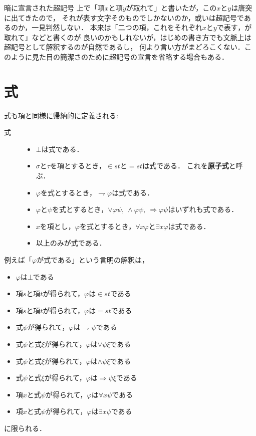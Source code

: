 	\begin{itembox}[l]{暗に宣言された超記号}
		上で「項$x$と項$y$が取れて」と書いたが，この$x$と$y$は唐突に出てきたので，
		それが表す文字そのものでしかないのか，或いは超記号であるのか，一見判然しない．
		本来は「二つの項，これをそれぞれ$x$と$y$で表す，が取れて」などと書くのが
		良いのかもしれないが，はじめの書き方でも文脈上は超記号として解釈するのが自然であるし，
		何より言い方がまどろこくない．このように見た目の簡潔さのために超記号の宣言を省略する場合もある．
	\end{itembox}
	
\section{式}
	式も項と同様に帰納的に定義される:
	
	\begin{description}
		\item[式]
			\begin{itemize}
				\item $\bot$は式である．
				\item $\sigma$と$\tau$を項とするとき，$\in st$と$=st$は式である．
					これを{\bf 原子式}と呼ぶ．
				\item $\varphi$を式とするとき，$\rightharpoondown \varphi$は式である．
				\item $\varphi$と$\psi$を式とするとき，$\vee \varphi \psi,\ 
					\wedge \varphi \psi,\ \Longrightarrow \varphi \psi$はいずれも式である．
			
				\item $x$を項とし，$\varphi$を式とするとき，$\forall x \varphi$と$\exists x \varphi$は式である．
				
				\item 以上のみが式である．
			\end{itemize}
	\end{description}
	
	例えば「$\varphi$が式である」という言明の解釈は，
	\begin{itemize}
		\item $\varphi$は$\bot$である
		\item 項$s$と項$t$が得られて，$\varphi$は$\in s t$である
		\item 項$s$と項$t$が得られて，$\varphi$は$= s t$である
		\item 式$\psi$が得られて，$\varphi$は$\rightharpoondown \psi$である
		\item 式$\psi$と式$\xi$が得られて，$\varphi$は$\vee \psi \xi$である
		\item 式$\psi$と式$\xi$が得られて，$\varphi$は$\wedge \psi \xi$である
		\item 式$\psi$と式$\xi$が得られて，$\varphi$は$\Longrightarrow \psi \xi$である
		\item 項$x$と式$\psi$が得られて，$\varphi$は$\forall x \psi$である
		\item 項$x$と式$\psi$が得られて，$\varphi$は$\exists x \psi$である
	\end{itemize}
	に限られる．
	
